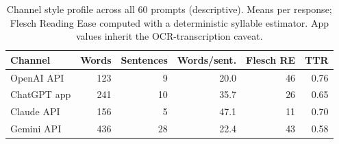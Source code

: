 \begin{table}[htbp]
\centering
\caption{Channel style profile across all 60 prompts (descriptive). Means per response; Flesch Reading Ease computed with a deterministic syllable estimator. App values inherit the OCR-transcription caveat.}
\label{tab:channel-style-profile}
\small
\begin{tabular}{lrrrrr}
\toprule
Channel & Words & Sentences & Words/sent. & Flesch RE & TTR \\
\midrule
OpenAI API & 123 & 9 & 20.0 & 46 & 0.76 \\
ChatGPT app & 241 & 10 & 35.7 & 26 & 0.65 \\
Claude API & 156 & 5 & 47.1 & 11 & 0.70 \\
Gemini API & 436 & 28 & 22.4 & 43 & 0.58 \\
\bottomrule
\end{tabular}
\end{table}
